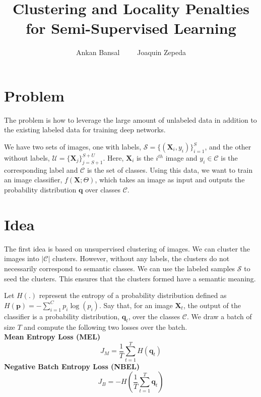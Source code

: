 \documentclass[runningheads]{llncs}
\begin{document}
%
\title{Clustering and Locality Penalties for Semi-Supervised Learning} 

%
\author{Ankan Bansal~~~~~Joaquin Zepeda}

%
\maketitle              %

\section{Problem}
The problem is how to leverage the large amount of unlabeled data in addition
to the existing labeled data for training deep networks. 

We have two sets of images, one with labels, $\mathcal{S} = \{(\mathbf{X}_i, y_i)\}_{i=1}^S$, and 
the other without labels, $\mathcal{U} = \{\mathbf{X}_j\}_{j=S+1}^{S+U}$. Here, $\mathbf{X}_i$ is the
$i^{th}$ image and $y_i \in \mathcal{C}$ is the corresponding label and $\mathcal{C}$ is the set of
classes.  Using this data, we want to train an image classifier, $f(\mathbf{X}; \Theta)$,
which takes an image as input and outputs the probability distribution $\mathbf{q}$ over classes
$\mathcal{C}$.


\section{Idea}
The first idea is based on unsupervised clustering of images. We can cluster the images into
$|\mathcal{C}|$ clusters. However, without any labels, the clusters do not necessarily
correspond to semantic classes. We can use the labeled samples $\mathcal{S}$ to seed the clusters.
This ensures that the clusters formed have a semantic meaning.

Let $H(.)$ represent the entropy of a probability distribution defined as $H(\mathbf{p}) =
-\sum_{i=1}^{C}p_i \log(p_i)$.  Say that, for an image $\mathbf{X}_t$, the output of the classifier
is a probability distribution, $\mathbf{q}_t$, over the classes $\mathcal{C}$. We draw a batch of
size $T$ and compute the following two losses over the batch.\\
\textbf{Mean Entropy Loss (MEL)}
\begin{equation}
	J_M = \frac{1}{T}\sum_{t=1}^{T}H(\mathbf{q}_t)
\end{equation}
\textbf{Negative Batch Entropy Loss (NBEL)}
\begin{equation}
	J_B = -H(\frac{1}{T}\sum_{t=1}^{T}\mathbf{q}_t)
\end{equation}
\end{document}
